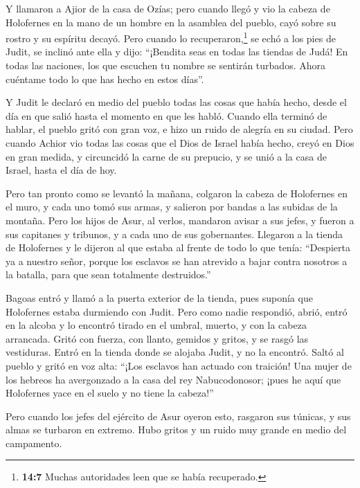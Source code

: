  Y llamaron a Ajior de la casa de Ozías; pero cuando llegó
y vio la cabeza de Holofernes en la mano de un hombre en la asamblea del
pueblo, cayó sobre su rostro y su espíritu decayó.  Pero
cuando lo recuperaron,\footnote{\textbf{14:7} Muchas autoridades leen
  que se había recuperado.} se echó a los pies de Judit, se inclinó ante
ella y dijo: ``¡Bendita seas en todas las tiendas de Judá! En todas las
naciones, los que escuchen tu nombre se sentirán turbados.
 Ahora cuéntame todo lo que has hecho en estos días''.

Y Judit le declaró en medio del pueblo todas las cosas que había hecho,
desde el día en que salió hasta el momento en que les habló.
 Cuando ella terminó de hablar, el pueblo gritó con gran
voz, e hizo un ruido de alegría en su ciudad.  Pero
cuando Achior vio todas las cosas que el Dios de Israel había hecho,
creyó en Dios en gran medida, y circuncidó la carne de su prepucio, y se
unió a la casa de Israel, hasta el día de hoy.

 Pero tan pronto como se levantó la mañana, colgaron la
cabeza de Holofernes en el muro, y cada uno tomó sus armas, y salieron
por bandas a las subidas de la montaña.  Pero los hijos
de Asur, al verlos, mandaron avisar a sus jefes, y fueron a sus
capitanes y tribunos, y a cada uno de sus gobernantes. 
Llegaron a la tienda de Holofernes y le dijeron al que estaba al frente
de todo lo que tenía: ``Despierta ya a nuestro señor, porque los
esclavos se han atrevido a bajar contra nosotros a la batalla, para que
sean totalmente destruidos.''

 Bagoas entró y llamó a la puerta exterior de la tienda,
pues suponía que Holofernes estaba durmiendo con Judit. 
Pero como nadie respondió, abrió, entró en la alcoba y lo encontró
tirado en el umbral, muerto, y con la cabeza arrancada. 
Gritó con fuerza, con llanto, gemidos y gritos, y se rasgó las
vestiduras.  Entró en la tienda donde se alojaba Judit, y
no la encontró. Saltó al pueblo y gritó en voz alta: 
``¡Los esclavos han actuado con traición! Una mujer de los hebreos ha
avergonzado a la casa del rey Nabucodonosor; ¡pues he aquí que
Holofernes yace en el suelo y no tiene la cabeza!''

 Pero cuando los jefes del ejército de Asur oyeron esto,
rasgaron sus túnicas, y sus almas se turbaron en extremo. Hubo gritos y
un ruido muy grande en medio del campamento.

